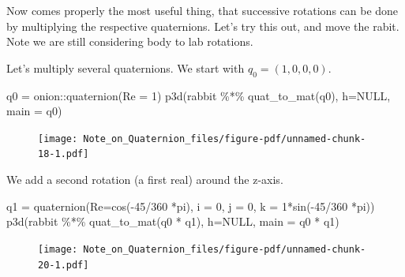 \documentclass[
  letterpaper,
  DIV=11,
  numbers=noendperiod]{scrartcl}
\newenvironment{Shaded}{\begin{snugshade}}{\end{snugshade}}
\newcommand{\AttributeTok}[1]{\textcolor[rgb]{0.40,0.45,0.13}{#1}}
\newcommand{\ConstantTok}[1]{\textcolor[rgb]{0.56,0.35,0.01}{#1}}
\newcommand{\DecValTok}[1]{\textcolor[rgb]{0.68,0.00,0.00}{#1}}
\newcommand{\FunctionTok}[1]{\textcolor[rgb]{0.28,0.35,0.67}{#1}}
\newcommand{\NormalTok}[1]{\textcolor[rgb]{0.00,0.23,0.31}{#1}}
\newcommand{\OtherTok}[1]{\textcolor[rgb]{0.00,0.23,0.31}{#1}}
\newcommand{\SpecialCharTok}[1]{\textcolor[rgb]{0.37,0.37,0.37}{#1}}
\newcommand{\StringTok}[1]{\textcolor[rgb]{0.13,0.47,0.30}{#1}}
\begin{document}
Now comes properly the most useful thing, that successive rotations can
be done by multiplying the respective quaternions. Let's try this out,
and move the rabit. Note we are still considering body to lab rotations.

Let's multiply several quaternions. We start with \(q_0 = (1,0,0,0)\).

\begin{Shaded}
\begin{Highlighting}[]
\NormalTok{  q0 }\OtherTok{=}\NormalTok{ onion}\SpecialCharTok{::}\FunctionTok{quaternion}\NormalTok{(}\AttributeTok{Re =} \DecValTok{1}\NormalTok{)}
  \FunctionTok{p3d}\NormalTok{(rabbit }\SpecialCharTok{\%*\%} \FunctionTok{quat\_to\_mat}\NormalTok{(q0), }\AttributeTok{h=}\ConstantTok{NULL}\NormalTok{, }\AttributeTok{main =} \StringTok{\textquotesingle{}q0\textquotesingle{}}\NormalTok{)}
\end{Highlighting}
\end{Shaded}

\begin{figure}[H]

{\centering \texttt{[image: Note\_on\_Quaternion\_files/figure-pdf/unnamed-chunk-18-1.pdf]}

}

\end{figure}

We add a second rotation (a first real) around the z-axis.

\begin{Shaded}
\begin{Highlighting}[]
\NormalTok{  q1 }\OtherTok{=} \FunctionTok{quaternion}\NormalTok{(}\AttributeTok{Re=}\FunctionTok{cos}\NormalTok{(}\SpecialCharTok{{-}}\DecValTok{45}\SpecialCharTok{/}\DecValTok{360} \SpecialCharTok{*}\NormalTok{pi), }\AttributeTok{i =} \DecValTok{0}\NormalTok{, }\AttributeTok{j =} \DecValTok{0}\NormalTok{, }\AttributeTok{k =} \DecValTok{1}\SpecialCharTok{*}\FunctionTok{sin}\NormalTok{(}\SpecialCharTok{{-}}\DecValTok{45}\SpecialCharTok{/}\DecValTok{360} \SpecialCharTok{*}\NormalTok{pi)) }
  \FunctionTok{p3d}\NormalTok{(rabbit }\SpecialCharTok{\%*\%} \FunctionTok{quat\_to\_mat}\NormalTok{(q0 }\SpecialCharTok{*}\NormalTok{ q1), }\AttributeTok{h=}\ConstantTok{NULL}\NormalTok{, }\AttributeTok{main =} \StringTok{\textquotesingle{}q0 * q1\textquotesingle{}}\NormalTok{) }
\end{Highlighting}
\end{Shaded}

\begin{figure}[H]

{\centering \texttt{[image: Note\_on\_Quaternion\_files/figure-pdf/unnamed-chunk-20-1.pdf]}

}

\end{figure}
\end{document}
